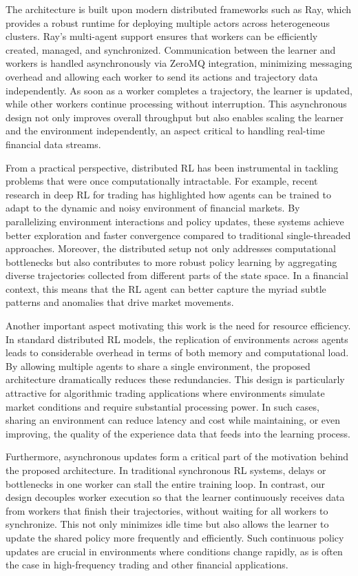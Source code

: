 The architecture is built upon modern distributed frameworks such as Ray, which provides a robust runtime
for deploying multiple actors across heterogeneous clusters.
Ray's multi-agent support ensures that workers can be efficiently created, managed, and synchronized.
Communication between the learner and workers is handled asynchronously via ZeroMQ integration, minimizing messaging
overhead and allowing each worker to send its actions and trajectory data independently.
As soon as a worker completes a trajectory, the learner is updated, while other workers continue processing without interruption.
This asynchronous design not only improves overall throughput but also enables scaling the learner and the environment independently,
an aspect critical to handling real-time financial data streams.


From a practical perspective, distributed RL has been instrumental in tackling problems that were once computationally intractable.
For example, recent research in deep RL for trading has highlighted how agents can be trained to adapt to the dynamic
and noisy environment of financial markets.
By parallelizing environment interactions and policy updates, these systems achieve better exploration
and faster convergence compared to traditional single-threaded approaches.
Moreover, the distributed setup not only addresses computational bottlenecks
but also contributes to more robust policy learning by aggregating diverse trajectories collected from different parts of the state space.
In a financial context, this means that the RL agent can better capture the myriad subtle patterns and anomalies that drive market movements.


Another important aspect motivating this work is the need for resource efficiency.
In standard distributed RL models, the replication of environments across agents leads to considerable overhead in terms of both memory and computational load.
By allowing multiple agents to share a single environment, the proposed architecture dramatically reduces these redundancies.
This design is particularly attractive for algorithmic trading applications where environments
simulate market conditions and require substantial processing power.
In such cases, sharing an environment can reduce latency and cost while maintaining, or even improving,
the quality of the experience data that feeds into the learning process.


Furthermore, asynchronous updates form a critical part of the motivation behind the proposed architecture.
In traditional synchronous RL systems, delays or bottlenecks in one worker can stall the entire training loop.
In contrast, our design decouples worker execution so that the learner continuously receives data from workers that finish their trajectories,
without waiting for all workers to synchronize.
This not only minimizes idle time but also allows the learner to update the shared policy more frequently and efficiently.
Such continuous policy updates are crucial in environments where conditions change rapidly, as is often the case in
high-frequency trading and other financial applications.


